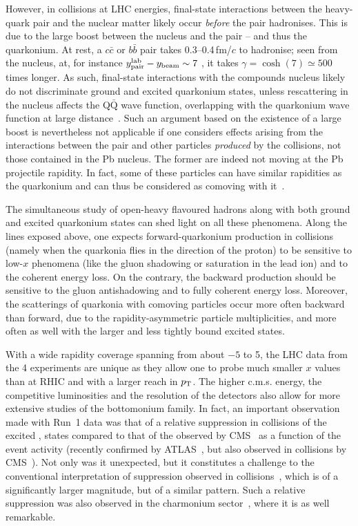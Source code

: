 \documentclass[../report.tex]{subfiles}
\begin{document}
However, in \pPb collisions at LHC energies, final-state interactions between the heavy-quark pair and the nuclear matter likely occur {\it before} the pair hadronises. This is due to the large boost between the nucleus and the pair -- and thus the quarkonium. At rest, a $c \bar c$ or $b\bar b$ pair takes 0.3--0.4\,fm/$c$ to hadronise; seen from the nucleus, at, for instance $y^{\rm lab}_{\rm pair}-y_{\rm beam} \sim 7$ , it takes $\gamma=\cosh(7) \simeq 500$ times longer. As such, final-state interactions with the compounds nucleus likely do not discriminate ground and excited quarkonium states, unless rescattering in the nucleus affects the Q$\bar{\text{Q}}$ wave function, overlapping with the quarkonium wave function at large distance~\cite{Benesh:1994du}. Such an argument based on the existence of a large boost is nevertheless not applicable if one considers effects arising from the interactions between the pair and other particles {\it produced} by the \pPb collisions, not those contained in the Pb nucleus. The former are indeed not moving at the Pb projectile rapidity. In fact, some of these particles can have similar rapidities as the quarkonium and can thus be considered as comoving with it~\cite{Gavin:1996yd,Brodsky:1988xz,Capella:2000zp}.
 
The simultaneous study of open-heavy flavoured hadrons along with both ground and excited quarkonium states can shed light on all these phenomena. Along the lines exposed above, one expects forward-quarkonium production in \pPb collisions (namely when the quarkonia flies in the direction of the proton) to be sensitive to low-$x$ phenomena (like the gluon shadowing or saturation in the lead ion) and to the coherent energy loss. On the contrary, the backward production should be sensitive to the gluon antishadowing and to fully coherent energy loss. Moreover, the scatterings of quarkonia with comoving particles occur more often backward than forward, due to the rapidity-asymmetric particle multiplicities, and more often as well with the larger and less tightly bound excited states. 
   
With a wide rapidity coverage spanning from about $-5$ to 5, the LHC data from the 4 experiments are unique as they allow one to probe much smaller $x$ values than at RHIC and with a larger reach in $p\sb{\scriptstyle\mathrm{T}}$. The higher c.m.s. energy, the competitive luminosities and the resolution of the detectors also allow for more extensive studies of the bottomonium family. In fact, an important observation made with Run~1 data was that of a relative suppression in \pPb collisions of the excited , states compared to that of the  observed by CMS~\cite{Chatrchyan:2013nza} as a function of the event activity (recently confirmed by ATLAS~\cite{Aaboud:2017cif}, but also observed in \pp collisions by CMS~\cite{CMS-PAS-BPH-14-009}). Not only was it unexpected, but it constitutes a challenge to the conventional interpretation of suppression observed in \PbPb collisions~\cite{Chatrchyan:2012lxa,Sirunyan:2017lzi,Sirunyan:2018nsz}, which is of a significantly larger magnitude, but of a similar pattern. Such a relative suppression was also observed in the charmonium sector~\cite{Abelev:2014zpa}, where it is as well remarkable.
\end{document}
